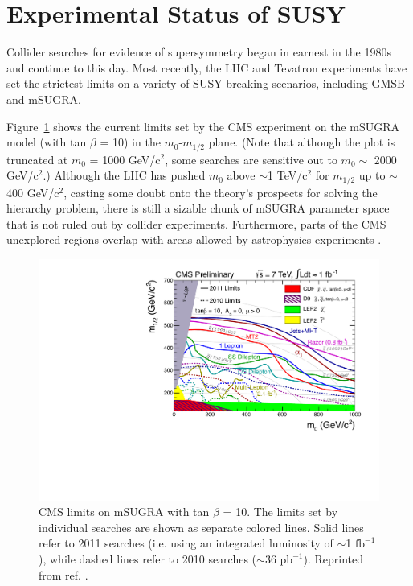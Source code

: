 \documentclass[dissertation.tex]{subfiles}
\begin{document}
\section{Experimental Status of SUSY}
\label{sec:Experimental Status of SUSY}

Collider searches for evidence of supersymmetry began in earnest in the 1980s \cite{SUSY_history} and continue to this day.  Most recently, the LHC and Tevatron experiments have set the strictest limits on a variety of SUSY breaking scenarios, including GMSB and mSUGRA.

Figure~\ref{fig:CMS_SUSY_2011Limits_tanb10} shows the current limits set by the CMS experiment on the mSUGRA model (with tan $\beta$ = 10) in the $m_{0}$-$m_{1/2}$ plane.  (Note that although the plot is truncated at $m_{0}$ = 1000 GeV/$\mbox{c}^{2}$, some searches are sensitive out to $m_{0} \sim$ 2000 GeV/$\mbox{c}^{2}$.)  Although the LHC has pushed $m_{0}$ above $\sim$1 TeV/$\mbox{c}^{2}$ for $m_{1/2}$ up to $\sim$400 GeV/$\mbox{c}^{2}$, casting some doubt onto the theory's prospects for solving the hierarchy problem, there is still a sizable chunk of mSUGRA parameter space that is not ruled out by collider experiments.  Furthermore, parts of the CMS unexplored regions overlap with areas allowed by astrophysics experiments \cite{CMSSM_fits}.

\begin{figure}
	\centering
	\includegraphics[scale=0.6]{CMS_SUSY_2011Limits_tanb10}
	\caption{CMS limits on mSUGRA with tan $\beta$ = 10.  The limits set by individual searches are shown as separate colored lines.  Solid lines refer to 2011 searches (i.e. using an integrated luminosity of $\sim$1 $\mbox{fb}^{-1}$), while dashed lines refer to 2010 searches ($\sim$36 $\mbox{pb}^{-1}$).  Reprinted from ref. \cite{CMS_mSUGRA}.}
	\label{fig:CMS_SUSY_2011Limits_tanb10}
\end{figure}
\end{document}
